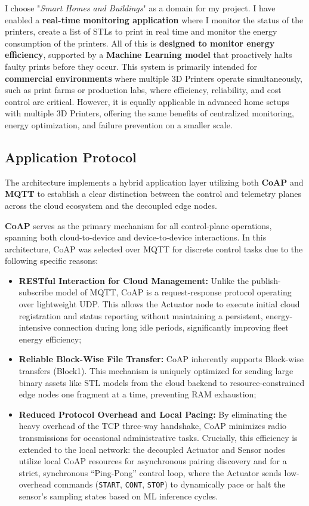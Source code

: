I choose "\textit{Smart Homes and Buildings}" as a domain for my project. I have enabled a \textbf{real-time monitoring application} where I monitor the status of the printers, create a list of STLs to print in real time and monitor the energy consumption of the printers. All of this is \textbf{designed to monitor energy efficiency}, supported by a \textbf{Machine Learning model} that proactively halts faulty prints before they occur. This system is primarily intended for \textbf{commercial environments} where multiple 3D Printers operate simultaneously, such as print farms or production labs, where efficiency, reliability, and cost control are critical. However, it is equally applicable in advanced home setups with multiple 3D Printers, offering the same benefits of centralized monitoring, energy optimization, and failure prevention on a smaller scale. 

\subsection{Application Protocol}
The architecture implements a hybrid application layer utilizing both \textbf{CoAP} and \textbf{MQTT} to establish a clear distinction between the control and telemetry planes across the cloud ecosystem and the decoupled edge nodes. 

\medspace

\textbf{CoAP} serves as the primary mechanism for all control-plane operations, spanning both cloud-to-device and device-to-device interactions. In this architecture, CoAP was selected over MQTT for discrete control tasks due to the following specific reasons:
\begin{itemize}
	\item \textbf{RESTful Interaction for Cloud Management:} Unlike the publish-subscribe model of MQTT, CoAP is a request-response protocol operating over lightweight UDP. This allows the Actuator node to execute initial cloud registration and status reporting without maintaining a persistent, energy-intensive connection during long idle periods, significantly improving fleet energy efficiency;
	\item \textbf{Reliable Block-Wise File Transfer:} CoAP inherently supports Block-wise transfers (Block1). This mechanism is uniquely optimized for sending large binary assets like STL models from the cloud backend to resource-constrained edge nodes one fragment at a time, preventing RAM exhaustion;
	\item \textbf{Reduced Protocol Overhead and Local Pacing:} By eliminating the heavy overhead of the TCP three-way handshake, CoAP minimizes radio transmissions for occasional administrative tasks. Crucially, this efficiency is extended to the local network: the decoupled Actuator and Sensor nodes utilize local CoAP resources for asynchronous pairing discovery and for a strict, synchronous ``Ping-Pong'' control loop, where the Actuator sends low-overhead commands (\texttt{START}, \texttt{CONT}, \texttt{STOP}) to dynamically pace or halt the sensor's sampling states based on ML inference cycles.
\end{itemize}

